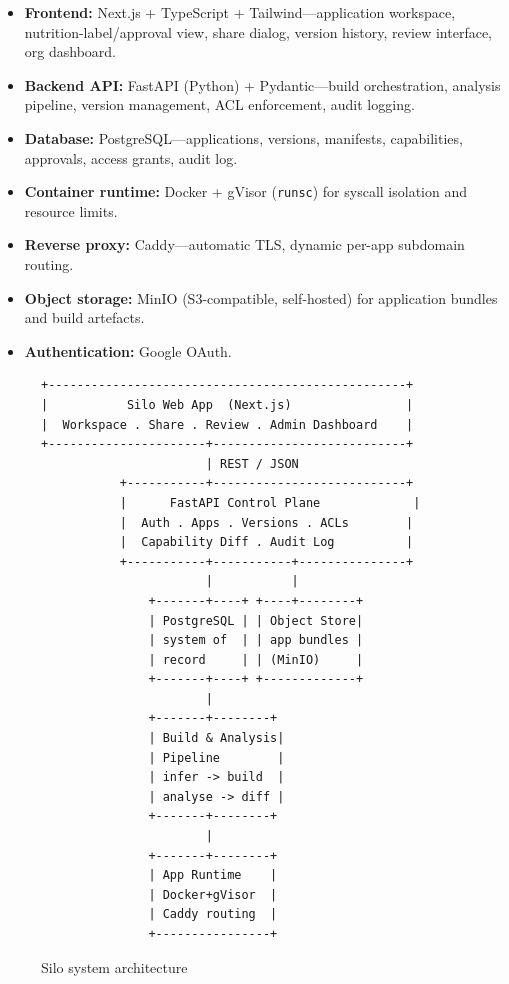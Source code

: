 \documentclass[11pt,a4paper]{article}
\begin{document}
\begin{itemize}[leftmargin=0.7cm]
  \item \textbf{Frontend:} Next.js + TypeScript + Tailwind---application workspace,
    nutrition-label/approval view, share dialog, version history, review interface,
    org dashboard.
  \item \textbf{Backend API:} FastAPI (Python) + Pydantic---build orchestration,
    analysis pipeline, version management, ACL enforcement, audit logging.
  \item \textbf{Database:} PostgreSQL---applications, versions, manifests,
    capabilities, approvals, access grants, audit log.
  \item \textbf{Container runtime:} Docker + gVisor (\texttt{runsc}) for syscall
    isolation and resource limits.
  \item \textbf{Reverse proxy:} Caddy---automatic TLS, dynamic per-app subdomain
    routing.
  \item \textbf{Object storage:} MinIO (S3-compatible, self-hosted) for application
    bundles and build artefacts.
  \item \textbf{Authentication:} Google OAuth.
\end{itemize}

\begin{figure}[h]
\centering
\begin{verbatim}
+--------------------------------------------------+
|           Silo Web App  (Next.js)                |
|  Workspace . Share . Review . Admin Dashboard    |
+----------------------+---------------------------+
                       | REST / JSON
           +-----------+---------------------------+
           |      FastAPI Control Plane             |
           |  Auth . Apps . Versions . ACLs        |
           |  Capability Diff . Audit Log          |
           +-----------+-----------+---------------+
                       |           |
               +-------+----+ +----+--------+
               | PostgreSQL | | Object Store|
               | system of  | | app bundles |
               | record     | | (MinIO)     |
               +-------+----+ +-------------+
                       |
               +-------+--------+
               | Build & Analysis|
               | Pipeline        |
               | infer -> build  |
               | analyse -> diff |
               +-------+--------+
                       |
               +-------+--------+
               | App Runtime    |
               | Docker+gVisor  |
               | Caddy routing  |
               +----------------+
\end{verbatim}
\caption{Silo system architecture}
\end{figure}
\end{document}
